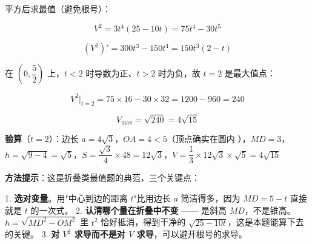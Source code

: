 \begin{answer}
平方后求最值（避免根号）：

\nopagebreak[4]
\[V^{2}=3t^{4}(25-10t)=75t^{4}-30t^{5}\]

\nopagebreak[4]
\[\left(V^{2}\right)'=300t^{3}-150t^{4}=150t^{3}(2-t)\]

在 $\left(0,\dfrac52\right)$ 上，$t<2$ 时导数为正、$t>2$ 时为负，故 $t=2$ 是最大值点：

\nopagebreak[4]
\[V^{2}\Big|_{t=2}=75\times16-30\times32=1200-960=240\]

\nopagebreak[4]
\[V_{\max}=\sqrt{240}=4\sqrt{15}\]

\textbf{验算}（$t=2$）：边长 $a=4\sqrt3$，$OA=4<5$（顶点确实在圆内 ），$MD=3$，$h=\sqrt{9-4}=\sqrt5$，$S=\dfrac{\sqrt3}4\times48=12\sqrt3$，$V=\dfrac13\times12\sqrt3\times\sqrt5=4\sqrt{15}$ 

\begin{gktip}
\textbf{方法提示}：这是折叠类最值题的典范，三个关键点：

1. \textbf{选对变量}。用"中心到边的距离 $t$"比用边长 $a$ 简洁得多，因为 $MD=5-t$ 直接就是 $t$ 的一次式。
2. \textbf{认清哪个量在折叠中不变} —— 是斜高 $MD$，不是锥高。$h=\sqrt{MD^{2}-OM^{2}}$ 里 $t^{2}$ 恰好抵消，得到干净的 $\sqrt{25-10t}$，这是本题能算下去的关键。
3. \textbf{对 $V^{2}$ 求导而不是对 $V$ 求导}，可以避开根号的求导。
\end{gktip}


\par\medskip

\end{answer}

